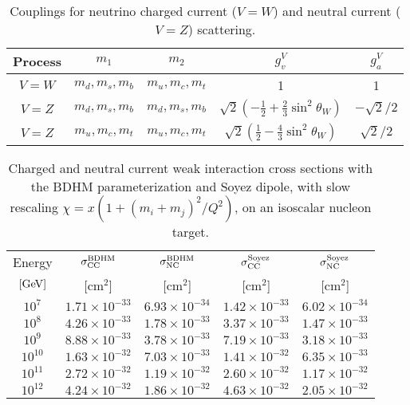 \documentclass[aps,10pt,twocolumn,tightenlines]{revtex4-1}
\begin{document}
\begin{appendix}
\begin{table}[h]
\caption{Couplings for neutrino charged current ($V=W$) and neutral current ($V=Z$) scattering.}
\begin{center}
\begin{tabular}{|c|c|c|c|c|}
\hline
Process & $m_1$ & $m_2$ & $g_v^V$ & $g_a^V$\\
\hline
$V=W$  & $m_d,m_s,m_b$ & $m_u,m_c,m_t$ & 1 & 1\\
\hline
$V=Z $  & $m_d,m_s,m_b$ & $m_d,m_s,m_b$ & $\sqrt{2}(-\frac{1}{2}+\frac{2}{3}\sin^2\theta_W)$ & $-\sqrt{2}/2$\\
\hline
$V=Z $ & $m_u,m_c,m_t$ & $m_u,m_c,m_t$ & $\sqrt{2}(\frac{1}{2}-\frac{4}{3}\sin^2\theta_W)$ & $\sqrt{2}/2$\\
\hline
\end{tabular}
\end{center}
\label{table:dipolegv}
\end{table}



\begin{table}[htp]
\caption{Charged and neutral current weak interaction cross sections with the BDHM parameterization
and Soyez dipole, with slow rescaling $\chi = x(1+(m_i+m_j)^2/Q^2)$, on an isoscalar nucleon target. }
\begin{center}
\begin{tabular}{|c|c|c|c|c|}
\hline
Energy & $\sigma_{\rm CC}^{\rm BDHM}$& $\sigma_{\rm NC}^{\rm BDHM}$  & $\sigma_{\rm CC}^{\rm Soyez}$  & $\sigma_{\rm NC}^{\rm Soyez}$     \\
$[{\rm GeV}]$   & [cm$^2$] & [cm$^2$] & [cm$^2$] & [cm$^2$] \\ \hline
$10^7$ &$ 1.71\times 10^{-33} $& $6.93\times 10^{-34}$ &$ 1.42\times 10^{-33} $& $6.02\times 10^{-34}$\\ \hline
$10^8$ &$ 4.26\times 10^{-33} $& $1.78\times 10^{-33}$ &$ 3.37\times 10^{-33} $& $1.47\times 10^{-33}$\\ \hline
$10^9$ &$ 8.88\times 10^{-33} $& $3.78\times 10^{-33}$ &$ 7.19\times 10^{-33} $& $3.18\times 10^{-33}$\\ \hline
$10^{10}$ &$ 1.63\times 10^{-32} $& $7.03\times 10^{-33}$ &$ 1.41\times 10^{-32} $& $6.35\times 10^{-33}$\\ \hline
$10^{11}$ &$ 2.72\times 10^{-32} $& $1.19\times 10^{-32}$ &$ 2.60\times 10^{-32} $& $1.17\times 10^{-32}$\\ \hline
$10^{12}$ &$ 4.24\times 10^{-32} $& $1.86\times 10^{-32}$ &$ 4.63\times 10^{-32} $& $2.05\times 10^{-32}$\\ \hline
\end{tabular}
\end{center}
\label{table:soyezweak}
\end{table}


\end{appendix}


\newpage 


\end{document}
